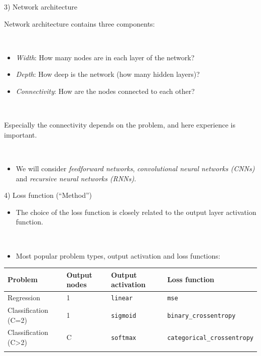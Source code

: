 \documentclass[
  10pt,
  ignorenonframetext,
  twocolumn]{beamer}
\providecommand{\tightlist}{%
  \setlength{\itemsep}{0pt}\setlength{\parskip}{0pt}}
\begin{document}
\begin{frame}
\begin{block}{3) Network architecture}
\label{network-architecture}
\(~\)

Network architecture contains three components:

\(~\)

\begin{itemize}
\item
  \emph{Width}: How many nodes are in each layer of the network?
\item
  \emph{Depth}: How deep is the network (how many hidden layers)?
\item
  \emph{Connectivity}: How are the nodes connected to each other?
\end{itemize}

\(~\)

Especially the connectivity depends on the problem, and here experience
is important.

\(~\)

\begin{itemize}
\tightlist
\item
  We will consider \emph{feedforward networks}, \emph{convolutional
  neural networks (CNNs)} and \emph{recursive neural networks (RNNs)}.
\end{itemize}
\end{block}
\end{frame}

\begin{frame}[fragile]
\begin{block}{4) Loss function (``Method'')}
\label{loss-function-method}
\(~\)

\begin{itemize}
\tightlist
\item
  The choice of the loss function is closely related to the output layer
  activation function.
\end{itemize}

\(~\)

\begin{itemize}
\tightlist
\item
  Most popular problem types, output activation and loss functions:
\end{itemize}

\scriptsize

\begin{longtable}[]{@{}llll@{}}
\toprule\noalign{}
Problem & Output nodes & Output activation & Loss function \\
\midrule\noalign{}
\endhead
Regression & 1 & \texttt{linear} & \texttt{mse} \\
Classification (C=2) & 1 & \texttt{sigmoid} &
\texttt{binary\_crossentropy} \\
Classification (C\textgreater2) & C & \texttt{softmax} &
\texttt{categorical\_crossentropy} \\
\bottomrule\noalign{}
\end{longtable}
\end{block}
\end{frame}
\end{document}
